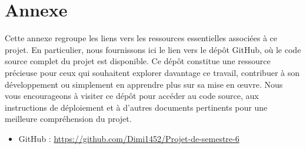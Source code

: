 \section{Annexe}
Cette annexe regroupe les liens vers les ressources essentielles associées à ce projet. En particulier, nous fournissons ici le lien vers le dépôt GitHub, où le code source complet du projet est disponible. Ce dépôt constitue une ressource précieuse pour ceux qui souhaitent explorer davantage ce travail, contribuer à son développement ou simplement en apprendre plus sur sa mise en œuvre. Nous vous encourageons à visiter ce dépôt pour accéder au code source, aux instructions de déploiement et à d'autres documents pertinents pour une meilleure compréhension du projet.\\



\begin{itemize}
	\item GitHub : \url{https://github.com/Dimi1452/Projet-de-semestre-6}\\
\end{itemize} 

